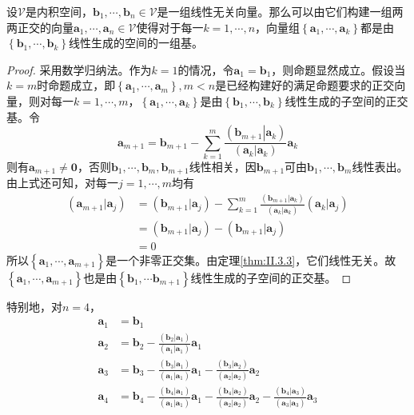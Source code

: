 \documentclass[main.tex]{subfiles}
\begin{document}
\begin{theorem}
设$\mathcal{V}$是内积空间，$\mathbf{b}_1,\cdots,\mathbf{b}_n\in\mathcal{V}$是一组线性无关向量。那么可以由它们构建一组两两正交的向量$\mathbf{a}_1,\cdots,\mathbf{a}_n\in\mathcal{V}$使得对于每一$k=1,\cdots,n$，向量组$\left\{\mathbf{a}_1,\cdots,\mathbf{a}_k\right\}$都是由$\left\{\mathbf{b}_1,\cdots,\mathbf{b}_k\right\}$线性生成的空间的一组基。
\end{theorem}
\begin{proof}
采用数学归纳法。作为$k=1$的情况，令$\mathbf{a}_1=\mathbf{b}_1$，则命题显然成立。假设当$k=m$时命题成立，即$\left\{\mathbf{a}_1,\cdots,\mathbf{a}_m\right\},m<n$是已经构建好的满足命题要求的正交向量，则对每一$k=1,\cdots,m$，$\left\{\mathbf{a}_1,\cdots,\mathbf{a}_k\right\}$是由$\left\{\mathbf{b}_1,\cdots,\mathbf{b}_k\right\}$线性生成的子空间的正交基。令
\[
\mathbf{a}_{m+1}=\mathbf{b}_{m+1}-\sum_{k=1}^m\frac{\left(\left.\mathbf{b}_{m+1}\right|\left.\mathbf{a}_k\right.\right)}{\left(\mathbf{a}_k|\mathbf{a}_k\right)}\mathbf{a}_k
\]
则有$\mathbf{a}_{m+1}\neq\mathbf{0}$，否则$\mathbf{b}_1,\cdots,\mathbf{b}_m,\mathbf{b}_{m+1}$线性相关，因$\mathbf{b}_{m+1}$可由$\mathbf{b}_1,\cdots,\mathbf{b}_m$线性表出。由上式还可知，对每一$j=1,\cdots,m$均有
\begin{align*}
\left(\mathbf{a}_{m+1}|\mathbf{a}_j\right)&=\left(\mathbf{b}_{m+1}|\mathbf{a}_j\right)-\sum_{k=1}^m\frac{\left(\mathbf{b}_{m+1}|\mathbf{a}_k\right)}{\left(\mathbf{a}_k|\mathbf{a}_k\right)}\left(\mathbf{a}_k|\mathbf{a}_j\right)\\
&=\left(\mathbf{b}_{m+1}|\mathbf{a}_j\right)-\left(\mathbf{b}_{m+1}|\mathbf{a}_j\right)\\
&=0
\end{align*}
所以$\left\{\mathbf{a}_1,\cdots,\mathbf{a}_{m+1}\right\}$是一个非零正交集。由定理\ref{thm:II.3.3}，它们线性无关。故$\left\{\mathbf{a}_1,\cdots,\mathbf{a}_{m+1}\right\}$也是由$\left\{\mathbf{b}_1,\cdots\mathbf{b}_{m+1}\right\}$线性生成的子空间的正交基。
\end{proof}

特别地，对$n=4$，
\begin{align*}
    \mathbf{a}_1&=\mathbf{b}_1\\
    \mathbf{a}_2&=\mathbf{b}_2-\frac{\left(\mathbf{b}_2|\mathbf{a}_1\right)}{\left(\mathbf{a}_1|\mathbf{a}_1\right)}\mathbf{a}_1\\
    \mathbf{a}_3&=\mathbf{b}_3-\frac{\left(\mathbf{b}_3|\mathbf{a}_1\right)}{\left(\mathbf{a}_1|\mathbf{a}_1\right)}\mathbf{a}_1-\frac{\left(\mathbf{b}_3|\mathbf{a}_2\right)}{\left(\mathbf{a}_2|\mathbf{a}_2\right)}\mathbf{a}_2\\
    \mathbf{a}_4&=\mathbf{b}_4-\frac{\left(\mathbf{b}_4|\mathbf{a}_1\right)}{\left(\mathbf{a}_1|\mathbf{a}_1\right)}\mathbf{a}_1-\frac{\left(\mathbf{b}_4|\mathbf{a}_2\right)}{\left(\mathbf{a}_2|\mathbf{a}_2\right)}\mathbf{a}_2-\frac{\left(\mathbf{b}_4|\mathbf{a}_3\right)}{\left(\mathbf{a}_3|\mathbf{a}_3\right)}\mathbf{a}_3
\end{align*}
\end{document}
